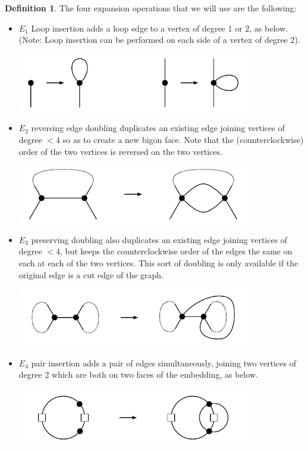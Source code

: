 \documentclass[amsmath,secnumarabic,floatfix,amssymb,nofootinbib,nobibnotes,letterpaper,11pt,tightenlines,showkeys]{revtex4}
\theoremstyle{definition}
\newtheorem{definition}[theorem]{Definition}
\newcommand{\loopinsert}{E_1}
\newcommand{\edgedouble}{E_2}
\newcommand{\cutedgedouble}{E_3}
\newcommand{\pairinsert}{E_4}
\begin{document}
\begin{definition}
The four expansion operations that we will use are the following:
\begin{itemize}
\item $\loopinsert$ Loop insertion adds a loop edge to a vertex of degree 1 or 2, as below. (Note: Loop insertion can be performed on each side of a vertex of degree 2).
  \begin{center}
    \includegraphics[width=4in]{loop-addition.pdf}
  \end{center}
\item $\edgedouble$ reversing edge doubling duplicates an existing edge joining vertices of degree $< 4$ so as to create a new bigon face. Note that the (counterclockwise) order of the two vertices is reversed on the two vertices.
  \begin{center}
    \includegraphics[width=4in]{edge-duplication-non-cut.pdf}
  \end{center}
\item $\cutedgedouble$ preserving doubling also duplicates an existing edge joining vertices of degree $<4$, but
keeps the counterclockwise order of the edges the same on each at each of the two vertices. This sort of doubling is only available if the original edge is a cut edge of the graph.
\begin{center}
  \includegraphics[width=4in]{edge-duplication-cut.pdf}
\end{center}
\item $\pairinsert$ pair insertion adds a pair of edges simultaneously, joining two vertices of degree 2 which are both on two faces of the embedding, as below.
  \begin{center}
    \includegraphics[width=4in]{pair-insertion.pdf}
  \end{center}
\end{itemize}
\end{definition}
\end{document}
